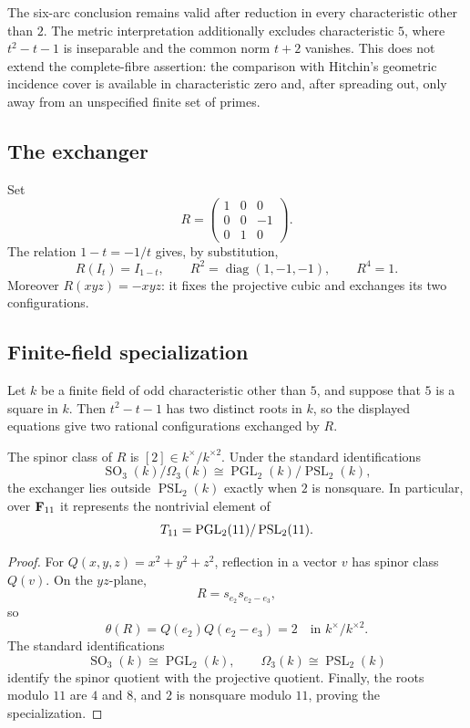 The six-arc conclusion remains valid after reduction in every characteristic
other than \(2\).  The metric interpretation additionally excludes
characteristic \(5\), where \(t^2-t-1\) is inseparable and the common norm
\(t+2\) vanishes.  This does not extend the complete-fibre assertion:
the comparison with Hitchin's geometric incidence cover is available in
characteristic zero and, after spreading out, only away from an unspecified
finite set of primes.

\subsection{The exchanger}
\label{sec:configuration-exchanger}

Set
\[
 R=
 \begin{pmatrix}
 1&0&0\\
 0&0&-1\\
 0&1&0
 \end{pmatrix}.
\]
The relation \(1-t=-1/t\) gives, by substitution,
\[
 R(I_t)=I_{1-t},\qquad
 R^2=\operatorname{diag}(1,-1,-1),\qquad R^4=1.
\]
Moreover \(R(xyz)=-xyz\): it fixes the projective cubic and exchanges its
two configurations.

\subsection{Finite-field specialization}
\label{sec:finite-field-specialization}

Let \(k\) be a finite field of odd characteristic other than \(5\), and
suppose that \(5\) is a square in \(k\).  Then \(t^2-t-1\) has two distinct
roots in \(k\), so the displayed equations give two rational
configurations exchanged by \(R\).

\begin{proposition}\label{prop:spinor-specialization}
The spinor class of \(R\) is \([2]\in k^\times/k^{\times2}\).  Under the
standard identifications
\[
 \operatorname{SO}_3(k)/\Omega_3(k)
 \cong \operatorname{PGL}_2(k)/\operatorname{PSL}_2(k),
\]
the exchanger lies outside \(\operatorname{PSL}_2(k)\) exactly when \(2\)
is nonsquare.  In particular, over \(\mathbf F_{11}\) it represents the
nontrivial element of
\[
 T_{11}=\operatorname{PGL}_2(11)/\operatorname{PSL}_2(11).
\]
\end{proposition}

\begin{proof}
For \(Q(x,y,z)=x^2+y^2+z^2\), reflection in a vector \(v\) has spinor
class \(Q(v)\).  On the \(yz\)-plane,
\[
 R=s_{e_2}s_{e_2-e_3},
\]
so
\[
 \theta(R)=Q(e_2)Q(e_2-e_3)=2
 \quad\text{in }k^\times/k^{\times2}.
\]
The standard
identifications
\[
 \operatorname{SO}_3(k)\cong\operatorname{PGL}_2(k),
 \qquad
 \Omega_3(k)\cong\operatorname{PSL}_2(k)
\]
identify the spinor quotient with the projective quotient.  Finally, the
roots modulo \(11\) are \(4\) and \(8\), and \(2\) is nonsquare modulo
\(11\), proving the specialization.
\end{proof}

